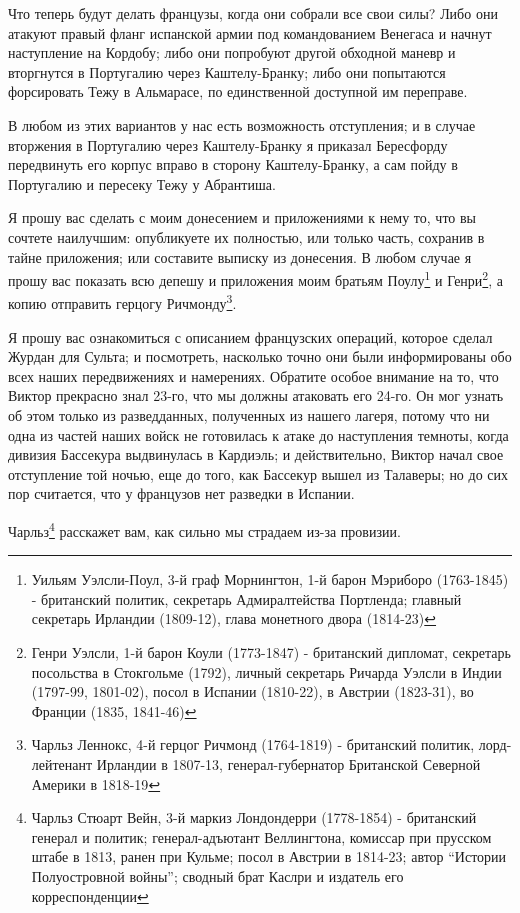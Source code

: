 \documentclass[
  oneside,
  12pt,
  titlepage]{book}
\begin{document}
Что теперь будут делать французы, когда они собрали все свои силы? Либо они атакуют правый фланг испанской армии под командованием Венегаса и начнут наступление на Кордобу; либо они попробуют другой обходной маневр и вторгнутся в Португалию через Каштелу-Бранку; либо они попытаются форсировать Тежу в Альмарасе, по единственной доступной им переправе.

В любом из этих вариантов у нас есть возможность отступления; и в случае вторжения в Португалию через Каштелу-Бранку я приказал Бересфорду передвинуть его корпус вправо в сторону Каштелу-Бранку, а сам пойду в Португалию и пересеку Тежу у Абрантиша.

Я прошу вас сделать с моим донесением и приложениями к нему то, что вы сочтете наилучшим: опубликуете их полностью, или только часть, сохранив в тайне приложения; или составите выписку из донесения. В любом случае я прошу вас показать всю депешу и приложения моим братьям Поулу\footnote{Уильям Уэлсли-Поул, 3-й граф Морнингтон, 1-й барон Мэриборо (1763-1845) - британский политик, секретарь Адмиралтейства Портленда; главный секретарь Ирландии (1809-12), глава монетного двора (1814-23)} и Генри\footnote{Генри Уэлсли, 1-й барон Коули (1773-1847) - британский дипломат, секретарь посольства в Стокгольме (1792), личный секретарь Ричарда Уэлсли в Индии (1797-99, 1801-02), посол в Испании (1810-22), в Австрии (1823-31), во Франции (1835, 1841-46)}, а копию отправить герцогу Ричмонду\footnote{Чарльз Леннокс, 4-й герцог Ричмонд (1764-1819) - британский политик, лорд-лейтенант Ирландии в 1807-13, генерал-губернатор Британской Северной Америки в 1818-19}.

Я прошу вас ознакомиться с описанием французских операций, которое сделал Журдан для Сульта; и посмотреть, насколько точно они были информированы обо всех наших передвижениях и намерениях. Обратите особое внимание на то, что Виктор прекрасно знал 23-го, что мы должны атаковать его 24-го. Он мог узнать об этом только из разведданных, полученных из нашего лагеря, потому что ни одна из частей наших войск не готовилась к атаке до наступления темноты, когда дивизия Бассекура выдвинулась в Кардиэль; и действительно, Виктор начал свое отступление той ночью, еще до того, как Бассекур вышел из Талаверы; но до сих пор считается, что у французов нет разведки в Испании.

Чарльз\footnote{Чарльз Стюарт Вейн, 3-й маркиз Лондондерри (1778-1854) - британский генерал и политик; генерал-адъютант Веллингтона, комиссар при прусском штабе в 1813, ранен при Кульме; посол в Австрии в 1814-23; автор ``Истории Полуостровной войны''; сводный брат Каслри и издатель его корреспонденции} расскажет вам, как сильно мы страдаем из-за провизии.
\end{document}

